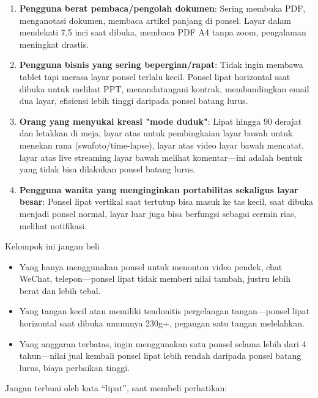 \begin{enumerate}
  \item \textbf{Pengguna berat pembaca/pengolah dokumen}: Sering membuka PDF, menganotasi dokumen, membaca artikel panjang di ponsel. Layar dalam mendekati 7,5 inci saat dibuka, membaca PDF A4 tanpa zoom, pengalaman meningkat drastis.
  \item \textbf{Pengguna bisnis yang sering bepergian/rapat}: Tidak ingin membawa tablet tapi merasa layar ponsel terlalu kecil. Ponsel lipat horizontal saat dibuka untuk melihat PPT, menandatangani kontrak, membandingkan email dua layar, efisiensi lebih tinggi daripada ponsel batang lurus.
  \item \textbf{Orang yang menyukai kreasi "mode duduk"}: Lipat hingga 90 derajat dan letakkan di meja, layar atas untuk pembingkaian layar bawah untuk menekan rana (swafoto/time-lapse), layar atas video layar bawah mencatat, layar atas live streaming layar bawah melihat komentar—ini adalah bentuk yang tidak bisa dilakukan ponsel batang lurus.
  \item \textbf{Pengguna wanita yang menginginkan portabilitas sekaligus layar besar}: Ponsel lipat vertikal saat tertutup bisa masuk ke tas kecil, saat dibuka menjadi ponsel normal, layar luar juga bisa berfungsi sebagai cermin rias, melihat notifikasi.
\end{enumerate}

\begin{tcbwarn}{Kelompok ini jangan beli}
\begin{itemize}
  \item Yang hanya menggunakan ponsel untuk menonton video pendek, chat WeChat, telepon—ponsel lipat tidak memberi nilai tambah, justru lebih berat dan lebih tebal.
  \item Yang tangan kecil atau memiliki tendonitis pergelangan tangan—ponsel lipat horizontal saat dibuka umumnya 230g+, pegangan satu tangan melelahkan.
  \item Yang anggaran terbatas, ingin menggunakan satu ponsel selama lebih dari 4 tahun—nilai jual kembali ponsel lipat lebih rendah daripada ponsel batang lurus, biaya perbaikan tinggi.
\end{itemize}

\end{tcbwarn}


Jangan terbuai oleh kata “lipat”, saat membeli perhatikan:

